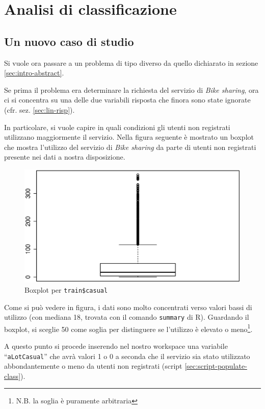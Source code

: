 \section{Analisi di classificazione}\label{sec:models-comparing}

\subsection{Un nuovo caso di studio}

Si vuole ora passare a un problema di tipo diverso da quello dichiarato in
sezione \ref{sec:intro-abstract}.

Se prima il problema era determinare la richiesta del servizio di \emph{Bike
sharing}, ora ci si concentra su una delle due variabili risposta che finora
sono state ignorate (cfr. sez. \ref{sec:lin-risp}).

In particolare, si vuole capire in quali condizioni gli utenti non registrati
utilizzano maggiormente il servizio. Nella figura seguente è mostrato un
boxplot che mostra l'utilizzo del servizio di \emph{Bike sharing} da parte di
utenti non registrati presente nei dati a nostra disposizione.

\begin{figure}[H]
  \centering
  \includegraphics[width=.5\columnwidth]{images/class/boxplot-casual.eps}
  \caption{Boxplot per \texttt{train\$casual}}
  \label{fig:simplest-linear-model}
\end{figure}

Come si può vedere in figura, i dati sono molto concentrati verso valori bassi
di utilizzo (con mediana 18, trovata con il comando \texttt{summary} di R).
Guardando il boxplot, si sceglie 50 come soglia per distinguere se l'utilizzo
è elevato o meno\footnote{N.B. la soglia è puramente arbitraria}.

A questo punto si procede inserendo nel nostro workspace una variabile
``\texttt{aLotCasual}'' che avrà valori 1 o 0 a seconda che il servizio sia
stato utilizzato abbondantemente o meno da utenti non registrati (script
\ref{sec:script-populate-class}).


